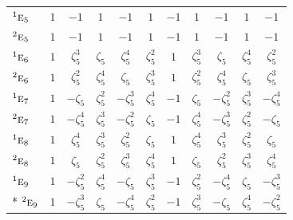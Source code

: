 \documentclass[10pt,a4paper]{article}
\numberwithin{equation}{section}
\newcommand{\irr}[1]{\text{\normalfont\scshape #1}}
\newcommand{\conjpair}[1]{{}^{#1}}
\newcommand{\rootunity}[1]{\zeta_{#1}}
\begin{document}
{\begin{longtable}{@{}lcccccccccc@{}}
$\conjpair{1}\irr{e}_{5}$ & $1$ & $-1$ & $1$ & $-1$ & $1$ & $-1$ & $1$ & $-1$ & $1$ & $-1$\\
$\conjpair{2}\irr{e}_{5}$ & $1$ & $-1$ & $1$ & $-1$ & $1$ & $-1$ & $1$ & $-1$ & $1$ & $-1$\\
$\conjpair{1}\irr{e}_{6}$ & $1$ & $\rootunity{5}^{3}$ & $\rootunity{5}$ & $\rootunity{5}^{4}$ & $\rootunity{5}^{2}$ & $1$ & $\rootunity{5}^{3}$ & $\rootunity{5}$ & $\rootunity{5}^{4}$ & $\rootunity{5}^{2}$\\
$\conjpair{2}\irr{e}_{6}$ & $1$ & $\rootunity{5}^{2}$ & $\rootunity{5}^{4}$ & $\rootunity{5}$ & $\rootunity{5}^{3}$ & $1$ & $\rootunity{5}^{2}$ & $\rootunity{5}^{4}$ & $\rootunity{5}$ & $\rootunity{5}^{3}$\\
$\conjpair{1}\irr{e}_{7}$ & $1$ & $-\rootunity{5}$ & $\rootunity{5}^{2}$ & $-\rootunity{5}^{3}$ & $\rootunity{5}^{4}$ & $-1$ & $\rootunity{5}$ & $-\rootunity{5}^{2}$ & $\rootunity{5}^{3}$ & $-\rootunity{5}^{4}$\\
$\conjpair{2}\irr{e}_{7}$ & $1$ & $-\rootunity{5}^{4}$ & $\rootunity{5}^{3}$ & $-\rootunity{5}^{2}$ & $\rootunity{5}$ & $-1$ & $\rootunity{5}^{4}$ & $-\rootunity{5}^{3}$ & $\rootunity{5}^{2}$ & $-\rootunity{5}$\\
$\conjpair{1}\irr{e}_{8}$ & $1$ & $\rootunity{5}^{4}$ & $\rootunity{5}^{3}$ & $\rootunity{5}^{2}$ & $\rootunity{5}$ & $1$ & $\rootunity{5}^{4}$ & $\rootunity{5}^{3}$ & $\rootunity{5}^{2}$ & $\rootunity{5}$\\
$\conjpair{2}\irr{e}_{8}$ & $1$ & $\rootunity{5}$ & $\rootunity{5}^{2}$ & $\rootunity{5}^{3}$ & $\rootunity{5}^{4}$ & $1$ & $\rootunity{5}$ & $\rootunity{5}^{2}$ & $\rootunity{5}^{3}$ & $\rootunity{5}^{4}$\\
$\conjpair{1}\irr{e}_{9}$ & $1$ & $-\rootunity{5}^{2}$ & $\rootunity{5}^{4}$ & $-\rootunity{5}$ & $\rootunity{5}^{3}$ & $-1$ & $\rootunity{5}^{2}$ & $-\rootunity{5}^{4}$ & $\rootunity{5}$ & $-\rootunity{5}^{3}$\\*
$\conjpair{2}\irr{e}_{9}$ & $1$ & $-\rootunity{5}^{3}$ & $\rootunity{5}$ & $-\rootunity{5}^{4}$ & $\rootunity{5}^{2}$ & $-1$ & $\rootunity{5}^{3}$ & $-\rootunity{5}$ & $\rootunity{5}^{4}$ & $-\rootunity{5}^{2}$\\
\bottomrule\end{longtable}}
\end{document}
